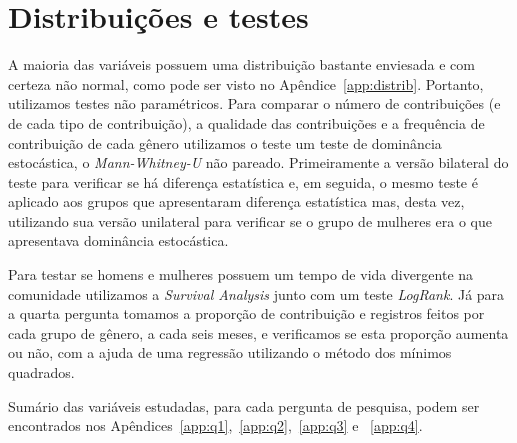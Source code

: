 \section{Distribuições e testes}

A maioria das variáveis possuem uma distribuição bastante enviesada e com certeza não normal, como pode ser visto no Apêndice~\ref{app:distrib}. Portanto, utilizamos testes não paramétricos. Para comparar o número de contribuições (e de cada tipo de contribuição), a qualidade das contribuições e a frequência de contribuição de cada gênero utilizamos o teste um teste de dominância estocástica, o \emph{Mann-Whitney-U} não pareado. Primeiramente a versão bilateral do teste para verificar se há diferença estatística e, em seguida, o mesmo teste é aplicado aos grupos que apresentaram diferença estatística mas, desta vez, utilizando sua versão unilateral para verificar se o grupo de mulheres era o que apresentava dominância estocástica.

Para testar se homens e mulheres possuem um tempo de vida divergente na comunidade utilizamos a \textit{Survival Analysis} junto com um teste \emph{LogRank}. Já para a quarta pergunta tomamos a proporção de contribuição e registros feitos por cada grupo de gênero, a cada seis meses, e verificamos se esta proporção aumenta ou não, com a ajuda de uma regressão utilizando o método dos mínimos quadrados.

Sumário das variáveis estudadas, para cada pergunta de pesquisa, podem ser encontrados nos Apêndices~\ref{app:q1},~\ref{app:q2},~\ref{app:q3} e ~\ref{app:q4}.


